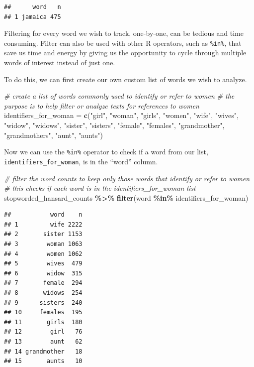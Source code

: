 \documentclass[
]{article}
\newenvironment{Shaded}{\begin{snugshade}}{\end{snugshade}}
\newcommand{\CommentTok}[1]{\textcolor[rgb]{0.56,0.35,0.01}{\textit{#1}}}
\newcommand{\FunctionTok}[1]{\textcolor[rgb]{0.13,0.29,0.53}{\textbf{#1}}}
\newcommand{\NormalTok}[1]{#1}
\newcommand{\OtherTok}[1]{\textcolor[rgb]{0.56,0.35,0.01}{#1}}
\newcommand{\SpecialCharTok}[1]{\textcolor[rgb]{0.81,0.36,0.00}{\textbf{#1}}}
\newcommand{\StringTok}[1]{\textcolor[rgb]{0.31,0.60,0.02}{#1}}
\begin{document}
\begin{verbatim}
##      word   n
## 1 jamaica 475
\end{verbatim}

Filtering for every word we wish to track, one-by-one, can be tedious
and time consuming. Filter can also be used with other R operators, such
as \texttt{\%in\%}, that save us time and energy by giving us the
opportunity to cycle through multiple words of interest instead of just
one.

To do this, we can first create our own custom list of words we wish to
analyze.

\begin{Shaded}
\begin{Highlighting}[]
\CommentTok{\# create a list of words commonly used to identify or refer to women}
\CommentTok{\# the purpose is to help filter or analyze texts for references to women}
\NormalTok{identifiers\_for\_woman }\OtherTok{=} \FunctionTok{c}\NormalTok{(}\StringTok{"girl"}\NormalTok{, }\StringTok{"woman"}\NormalTok{, }\StringTok{"girls"}\NormalTok{, }\StringTok{"women"}\NormalTok{, }\StringTok{"wife"}\NormalTok{, }\StringTok{"wives"}\NormalTok{, }\StringTok{"widow"}\NormalTok{,}
                      \StringTok{"widows"}\NormalTok{, }\StringTok{"sister"}\NormalTok{, }\StringTok{"sisters"}\NormalTok{, }\StringTok{"female"}\NormalTok{, }\StringTok{"females"}\NormalTok{, }\StringTok{"grandmother"}\NormalTok{, }
                      \StringTok{"grandmothers"}\NormalTok{, }\StringTok{"aunt"}\NormalTok{, }\StringTok{"aunts"}\NormalTok{)}
\end{Highlighting}
\end{Shaded}

Now we can use the \texttt{\%in\%} operator to check if a word from our
list, \texttt{identifiers\_for\_woman}, is in the ``word'' column.

\begin{Shaded}
\begin{Highlighting}[]
\CommentTok{\# filter the word counts to keep only those words that identify or refer to women}
\CommentTok{\# this checks if each word is in the \textquotesingle{}identifiers\_for\_woman\textquotesingle{} list}
\NormalTok{stopworded\_hansard\_counts }\SpecialCharTok{\%\textgreater{}\%} 
  \FunctionTok{filter}\NormalTok{(word }\SpecialCharTok{\%in\%}\NormalTok{ identifiers\_for\_woman)}
\end{Highlighting}
\end{Shaded}

\begin{verbatim}
##           word    n
## 1         wife 2222
## 2       sister 1153
## 3        woman 1063
## 4        women 1062
## 5        wives  479
## 6        widow  315
## 7       female  294
## 8       widows  254
## 9      sisters  240
## 10     females  195
## 11       girls  180
## 12        girl   76
## 13        aunt   62
## 14 grandmother   18
## 15       aunts   10
\end{verbatim}
\end{document}
